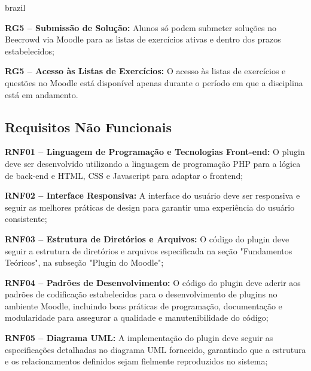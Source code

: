 \begin{otherlanguage*}{brazil}
\vspace{12pt}

\textbf{RG5 – Submissão de Solução:} Alunos só podem submeter soluções no Beecrowd via Moodle para as listas de exercícios ativas e dentro dos prazos estabelecidos;

\vspace{12pt}

\textbf{RG5 – Acesso às Listas de Exercícios:} O acesso às listas de exercícios e questões no Moodle está disponível apenas durante o período em que a disciplina está em andamento.

\vspace{12pt}

\subsection{Requisitos Não Funcionais}

\textbf{RNF01 – Linguagem de Programação e Tecnologias Front-end:} O plugin deve ser desenvolvido utilizando a linguagem de programação PHP para a lógica de back-end e HTML, CSS e Javascript para adaptar o frontend;

\vspace{12pt}

\textbf{RNF02 – Interface Responsiva:} A interface do usuário deve ser responsiva e seguir as melhores práticas de design para garantir uma experiência do usuário consistente;

\vspace{12pt}

\textbf{RNF03 – Estrutura de Diretórios e Arquivos:} O código do plugin deve seguir a estrutura de diretórios e arquivos especificada na seção "Fundamentos Teóricos", na subseção "Plugin do Moodle";

\vspace{12pt}

\textbf{RNF04 – Padrões de Desenvolvimento:} O código do plugin deve aderir aos padrões de codificação estabelecidos para o desenvolvimento de plugins no ambiente Moodle, incluindo boas práticas de programação, documentação e modularidade para assegurar a qualidade e manutenibilidade do código;

\vspace{12pt}

\textbf{RNF05 – Diagrama UML:} A implementação do plugin deve seguir as especificações detalhadas no diagrama UML fornecido, garantindo que a estrutura e os relacionamentos definidos sejam fielmente reproduzidos no sistema;


\end{otherlanguage*}
